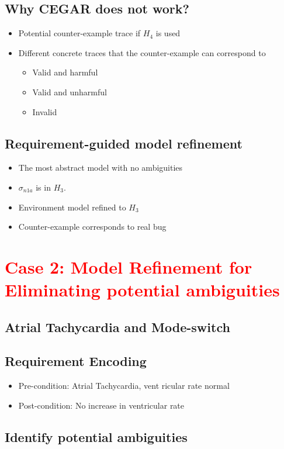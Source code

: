 \documentclass{llncs}
\begin{document}
\subsection{Why CEGAR does not work?}
\begin{itemize}
	\item Potential counter-example trace if $H_4$ is used
    \item Different concrete traces that the counter-example can correspond to
    
    \begin{itemize}
    	\item Valid and harmful
        \item Valid and unharmful
        \item Invalid
    \end{itemize}
\end{itemize}
\subsection{Requirement-guided model refinement}
\begin{itemize}
	\item The most abstract model with no ambiguities
    \item $\sigma_{n1a}$ is in $H_3$.
    \item Environment model refined to $H_3$
    \item Counter-example corresponds to real bug
\end{itemize}
\section{\textcolor{red}{Case 2: Model Refinement for Eliminating potential ambiguities}}
\subsection{Atrial Tachycardia and Mode-switch}
\subsection{Requirement Encoding}
\begin{itemize}
	\item Pre-condition: Atrial Tachycardia, vent  ricular rate normal
    \item Post-condition: No increase in ventricular rate
\end{itemize}
\subsection{Identify potential ambiguities}
\end{document}
